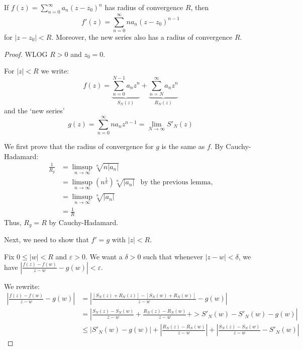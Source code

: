 \documentclass[12pt]{article}
\begin{document}
\begin{theorem}
    If $f(z)=\sum_{n=0}^{\infty}a_n(z-z_0)^{n}$ has radius of convergence $R$, then \[f'(z)=\sum_{n=0}^{\infty}na_n(z-z_0)^{n-1}\] for $|z-z_0|<R$. Moreover, the new series also has a radius of convergence $R$.
\end{theorem}
\begin{proof}
    WLOG $R>0$ and $z_0=0$. 
    
    For $|z|<R$ we write:
    \[f(z)=\underset{S_N(z)}{\underbrace{\sum_{n=0}^{N-1}a_nz^n}} + \underset{R_N(z)}{\underbrace{ \sum_{n=N}^{\infty}a_nz^n}}\]
    and the `new series'\[g(z)=\sum_{n=0}^{\infty}na_nz^{n-1}=\lim_{N\to \infty}S'_N(z)\]

    We first prove that the radius of convergence for $g$ is the same as $f$. By Cauchy-Hadamard:
    \begin{align*}
        \frac{1}{R_g}&=\limsup_{n\to \infty}\sqrt[n]{n|a_n|}\\
        &=\limsup_{n\to \infty}(n^{\frac{1}{n}})\sqrt[n]{|a_n|} & \text{by the previous lemma,}\\
        &= \limsup_{n\to \infty}\sqrt[n]{|a_n|}\\
        &= \frac{1}{R}
    \end{align*}
    Thus, $R_g=R$ by Cauchy-Hadamard.

    Next, we need to show that $f'=g$ with $|z|<R$.

    Fix $0\leq |w|<R$ and $\varepsilon>0$. We want a $\delta>0$ such that whenever $|z-w|<\delta$,  we have $\left|\frac{f(z)-f(w)}{z-w}-g(w)\right|<\varepsilon$.

    We rewrite:\begin{align*}
        \left|\frac{f(z)-f(w)}{z-w}-g(w)\right|
        &= \left| \frac{
            [S_N(z)+R_N(z)]-[S_N(w)+R_N(w)]
        }
        {z-w}
        -g(w)\right|\\
        &= \left|
            \frac{S_N(z)-S_N(w)}{z-w} +
            \frac{R_N(z)-R_N(w)}{z-w} +
            \gt{S'_N(w)-S'_N(w)} -
            g(w)
            \right|\\
        &\leq \left| S'_N(w)-g(w)
            \right| + 
            \left| \frac{R_N(z)-R_N(w)}{z-w}
            \right| + 
            \left| \frac{S_N(z)-S_N(w)}{z-w} - S'_N(w)
            \right|
    \end{align*}


\end{proof}
\end{document}
